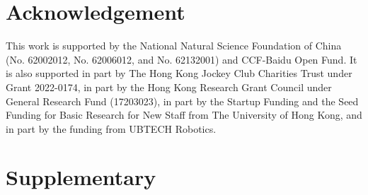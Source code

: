 \documentclass{article}
\begin{document}
\section{Acknowledgement}
This work is supported by the National Natural Science Foundation of China (No. 62002012, No. 62006012, and No. 62132001) and CCF-Baidu Open Fund. It is also supported in part by The Hong Kong Jockey Club Charities Trust under Grant 2022-0174, in part by the Hong Kong Research Grant Council under General Research Fund (17203023), in part by the Startup Funding and the Seed Funding for Basic Research for New Staff from The University of Hong Kong, and in part by the funding from UBTECH Robotics. 

\medskip

\newpage
\clearpage





\newpage
\clearpage

\appendix

\section*{Supplementary}
\end{document}
